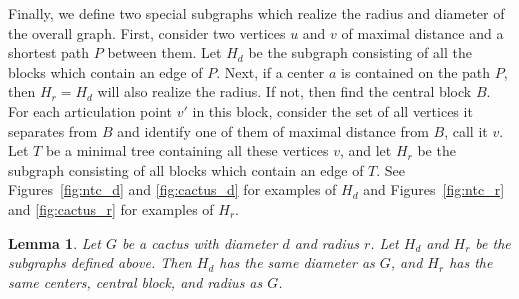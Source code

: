 \documentclass{amsart}
\newtheorem{lemma}[thm]{Lemma}
\theoremstyle{definition}
\begin{document}
Finally, we define two special subgraphs which realize the radius and diameter of the overall graph. First, consider two vertices $u$ and $v$ of maximal distance and a shortest path $P$ between them. Let $H_d$ be the subgraph consisting of all the blocks which contain an edge of $P$. Next, if a center $a$ is contained on the path $P$, then $H_r=H_d$ will also realize the radius. If not, then find the central block $B$. For each articulation point $v'$ in this block, consider the set of all vertices it separates from $B$ and identify one of them of maximal distance from $B$, call it $v$. Let $T$ be a minimal tree containing all these vertices $v$, and let $H_r$ be the subgraph consisting of all blocks which contain an edge of $T$. See Figures~\ref{fig:ntc_d} and \ref{fig:cactus_d} for examples of $H_d$ and Figures~\ref{fig:ntc_r} and \ref{fig:cactus_r} for examples of $H_r$.

\begin{lemma}\label{lemma:realize_rd}
Let $G$ be a cactus with diameter $d$ and radius $r$. Let $H_d$ and $H_r$ be the subgraphs defined above. Then $H_d$ has the same diameter as $G$, and $H_r$ has the same centers, central block, and radius as $G$.
\end{lemma}
\end{document}
